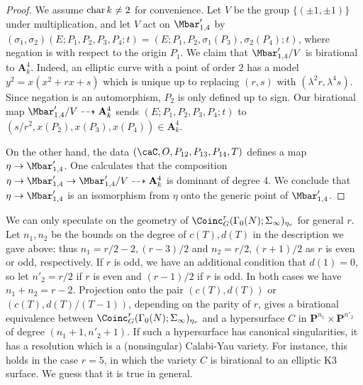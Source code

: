 \documentclass{article}
\DeclareMathOperator{\car}{{\rm char}}
\def\A{\mathbf{A}}
\def\P{\mathbf{P}}
\begin{document}
\begin{ex}


\begin{proof} We assume $\car k\neq 2$ for convenience.  Let $V$ be the group $\{(\pm 1, \pm 1)\}$ under multiplication, and let $V$ act on $\Mbar'_{1,4}$ by
$(\sigma_1,\sigma_2)(E;P_1,P_2,P_3,P_4;t) = (E;P_1,P_2,\sigma_1(P_3),\sigma_2(P_4);t)$, where negation is with respect to the origin $P_1$.  We claim that
$\Mbar'_{1,4}/V$ is birational to $\mathbf{A}^4_k$.  Indeed,  an elliptic curve with a point of
order $2$ has a model $y^2 = x(x^2+rx+s)$ which is unique up to replacing $(r,s)$ with $(\lambda^2 r,\lambda^4 s)$.   Since negation is an automorphism,  $P_2$ is only defined up to sign.  Our birational map $\Mbar'_{1,4}/V\dashrightarrow \mathbf{A}^4_k$ sends $(E;P_1,P_2,P_3,P_4;t)$ to 
$(s/r^2,x(P_2),x(P_3),x(P_4)) \in \A_k^4$. 

On the other hand, the data $(\caC,O,P_{12},P_{13},P_{14},T)$ defines a map $\eta\to \Mbar'_{1,4}$.  One calculates \cite{code} that the composition $\eta\to \Mbar'_{1,4}\to \Mbar'_{1,4}/V\dashrightarrow \A_k^4$ is dominant of degree 4.   We conclude that $\eta\to \Mbar'_{1,4}$ is an isomorphism from $\eta$ onto the generic point of $\Mbar'_{1,4}$.  %
\end{proof}
\end{ex}

We can only speculate on the geometry of $\Coinc^r_G(\Gamma_0(N);\Sigma_\infty)_{\eta_r}$ for general $r$.   Let $n_1,n_2$ be the bounds on the degree of $c(T),d(T)$ in the description we gave above:  thus $n_1=r/2-2,(r-3)/2$ and $n_2=r/2,(r+1)/2$ as $r$ is even or odd, respectively.  If $r$ is odd, we have an
additional condition that $d(1) = 0$, so let $n'_2 = r/2$ if $r$ is even
and $(r-1)/2$ if $r$ is odd.  In both cases we have $n_1+n_2=r-2$.  Projection onto the pair $(c(T),d(T))$ or $(c(T),d(T)/(T-1))$, depending on the parity
of $r$, gives a birational equivalence between $\Coinc^r_G(\Gamma_0(N);\Sigma_\infty)_{\eta_r}$ and a hypersurface $C$ in $\P^{n_1}\times\P^{n'_2}$ of degree $(n_1+1,n'_2+1)$.  
If such a hypersurface has canonical singularities, it has a resolution
which is a (nonsingular) Calabi-Yau variety.  For instance, this holds in the case $r=5$, in which the variety $C$ is birational to an elliptic K3 surface.
We guess that it is true in general.
\end{document}

